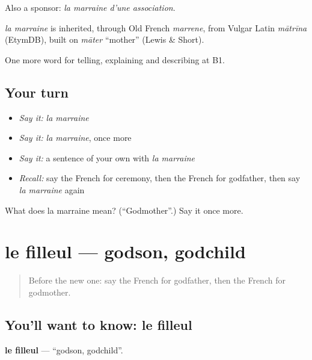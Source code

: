 Also a sponsor: \emph{la marraine d'une association}.

\begin{cousinweb}
\emph{la marraine} is inherited, through Old French \emph{marrene}, from Vulgar Latin \emph{mātrīna} (EtymDB), built on \emph{māter} \textquotedblleft{}mother\textquotedblright{} (Lewis \& Short).
\end{cousinweb}

\begin{grammarlens}[title={What you've built}]
One more word for telling, explaining and describing at B1.
\end{grammarlens}

\subsection*{Your turn}
\begin{itemize}
\raggedright
  \item \emph{Say it:} \emph{la marraine}
  \item \emph{Say it:} \emph{la marraine}, once more
  \item \emph{Say it:} a sentence of your own with \emph{la marraine}
  \item \emph{Recall:} say the French for ceremony, then the French for godfather, then say \emph{la marraine} again
\end{itemize}

\begin{tcolorbox}[breakable,colback=teal!4,colframe=teal!35!black,title={Before you move on}]
What does la marraine mean? (\textquotedblleft{}Godmother\textquotedblright{}.) Say it once more.
\end{tcolorbox}
\section[le filleul]{le filleul — godson, godchild}

\label{lesson:FR-C490-filleul}



\begin{quote}
Before the new one: say the French for godfather, then the French for godmother.
\end{quote}

\subsection*{You'll want to know: le filleul}
\textbf{le filleul} — \textquotedblleft{}godson, godchild\textquotedblright{}.

